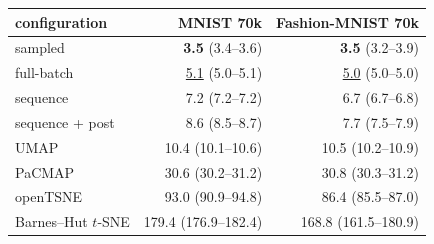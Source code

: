 \begin{tabular}{lrr}
\toprule
configuration & MNIST 70k & Fashion-MNIST 70k \\
\midrule
\magnet{} sampled & \textbf{3.5} (3.4--3.6) & \textbf{3.5} (3.2--3.9) \\
\magnet{} full-batch & \underline{5.1} (5.0--5.1) & \underline{5.0} (5.0--5.0) \\
\magnet{} sequence & 7.2 (7.2--7.2) & 6.7 (6.7--6.8) \\
\magnet{} sequence + post & 8.6 (8.5--8.7) & 7.7 (7.5--7.9) \\
UMAP & 10.4 (10.1--10.6) & 10.5 (10.2--10.9) \\
PaCMAP & 30.6 (30.2--31.2) & 30.8 (30.3--31.2) \\
openTSNE & 93.0 (90.9--94.8) & 86.4 (85.5--87.0) \\
Barnes--Hut $t$-SNE & 179.4 (176.9--182.4) & 168.8 (161.5--180.9) \\
\bottomrule
\end{tabular}

